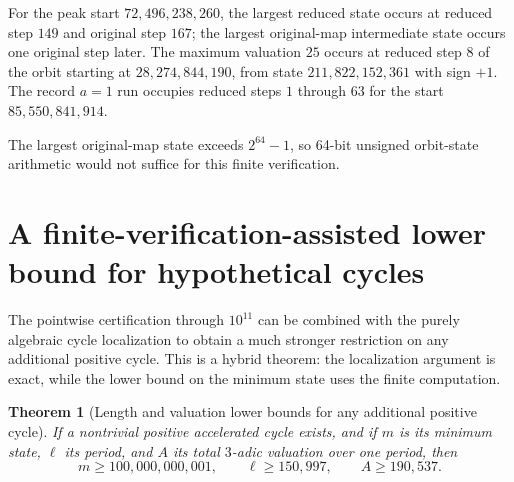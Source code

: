 \documentclass[11pt]{article}
\newtheorem{theorem}{Theorem}[section]
\theoremstyle{definition}
\theoremstyle{remark}
\begin{document}
For the peak start $72{,}496{,}238{,}260$, the largest reduced state occurs at reduced step $149$ and original step $167$; the largest original-map intermediate state occurs one original step later.  The maximum valuation $25$ occurs at reduced step $8$ of the orbit starting at $28{,}274{,}844{,}190$, from state $211{,}822{,}152{,}361$ with sign $+1$.  The record $a=1$ run occupies reduced steps $1$ through $63$ for the start $85{,}550{,}841{,}914$.

The largest original-map state exceeds $2^{64}-1$, so 64-bit unsigned orbit-state arithmetic would not suffice for this finite verification.

\section{A finite-verification-assisted lower bound for hypothetical cycles}

The pointwise certification through $10^{11}$ can be combined with the purely algebraic cycle localization to obtain a much stronger restriction on any additional positive cycle.  This is a hybrid theorem: the localization argument is exact, while the lower bound on the minimum state uses the finite computation.

\begin{theorem}[Length and valuation lower bounds for any additional positive cycle]
If a nontrivial positive accelerated cycle exists, and if $m$ is its minimum state, $\ell$ its period, and $A$ its total $3$-adic valuation over one period, then
\begin{equation}
\boxed{
m\ge100{,}000{,}000{,}001,
\qquad
\ell\ge150{,}997,
\qquad
A\ge190{,}537.
}
\label{eq:cycle-lower-bounds}
\end{equation}
\end{theorem}
\end{document}
